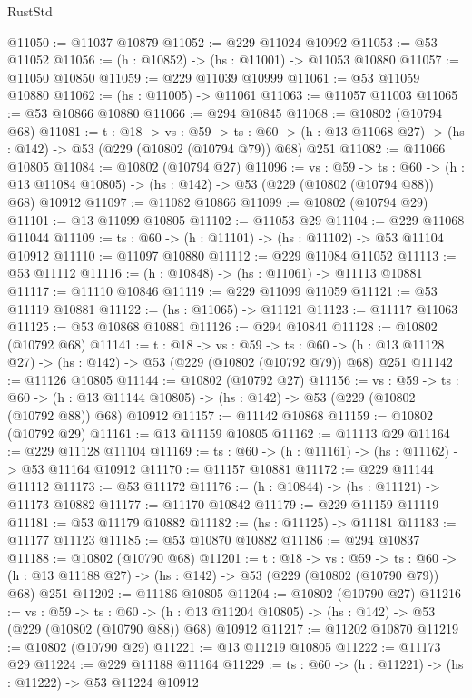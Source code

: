 \begin{lexlean}{RustStd}
\begin{coremodule}
@11050 := @11037 @10879
@11052 := @229 @11024 @10992
@11053 := @53 @11052
@11056 := (h : @10852) -> (hs : @11001) -> @11053 @10880
@11057 := @11050 @10850
@11059 := @229 @11039 @10999
@11061 := @53 @11059 @10880
@11062 := (hs : @11005) -> @11061
@11063 := @11057 @11003
@11065 := @53 @10866 @10880
@11066 := @294 @10845
@11068 := @10802 (@10794 @68)
@11081 := {t : @18} ->
  {vs : @59} ->
  {ts : @60} -> (h : @13 @11068 @27) -> (hs : @142) -> @53 (@229 (@10802 (@10794 @79)) @68) @251
@11082 := @11066 @10805
@11084 := @10802 (@10794 @27)
@11096 := {vs : @59} ->
  {ts : @60} ->
  (h : @13 @11084 @10805) -> (hs : @142) -> @53 (@229 (@10802 (@10794 @88)) @68) @10912
@11097 := @11082 @10866
@11099 := @10802 (@10794 @29)
@11101 := @13 @11099 @10805
@11102 := @11053 @29
@11104 := @229 @11068 @11044
@11109 := {ts : @60} -> (h : @11101) -> (hs : @11102) -> @53 @11104 @10912
@11110 := @11097 @10880
@11112 := @229 @11084 @11052
@11113 := @53 @11112
@11116 := (h : @10848) -> (hs : @11061) -> @11113 @10881
@11117 := @11110 @10846
@11119 := @229 @11099 @11059
@11121 := @53 @11119 @10881
@11122 := (hs : @11065) -> @11121
@11123 := @11117 @11063
@11125 := @53 @10868 @10881
@11126 := @294 @10841
@11128 := @10802 (@10792 @68)
@11141 := {t : @18} ->
  {vs : @59} ->
  {ts : @60} -> (h : @13 @11128 @27) -> (hs : @142) -> @53 (@229 (@10802 (@10792 @79)) @68) @251
@11142 := @11126 @10805
@11144 := @10802 (@10792 @27)
@11156 := {vs : @59} ->
  {ts : @60} ->
  (h : @13 @11144 @10805) -> (hs : @142) -> @53 (@229 (@10802 (@10792 @88)) @68) @10912
@11157 := @11142 @10868
@11159 := @10802 (@10792 @29)
@11161 := @13 @11159 @10805
@11162 := @11113 @29
@11164 := @229 @11128 @11104
@11169 := {ts : @60} -> (h : @11161) -> (hs : @11162) -> @53 @11164 @10912
@11170 := @11157 @10881
@11172 := @229 @11144 @11112
@11173 := @53 @11172
@11176 := (h : @10844) -> (hs : @11121) -> @11173 @10882
@11177 := @11170 @10842
@11179 := @229 @11159 @11119
@11181 := @53 @11179 @10882
@11182 := (hs : @11125) -> @11181
@11183 := @11177 @11123
@11185 := @53 @10870 @10882
@11186 := @294 @10837
@11188 := @10802 (@10790 @68)
@11201 := {t : @18} ->
  {vs : @59} ->
  {ts : @60} -> (h : @13 @11188 @27) -> (hs : @142) -> @53 (@229 (@10802 (@10790 @79)) @68) @251
@11202 := @11186 @10805
@11204 := @10802 (@10790 @27)
@11216 := {vs : @59} ->
  {ts : @60} ->
  (h : @13 @11204 @10805) -> (hs : @142) -> @53 (@229 (@10802 (@10790 @88)) @68) @10912
@11217 := @11202 @10870
@11219 := @10802 (@10790 @29)
@11221 := @13 @11219 @10805
@11222 := @11173 @29
@11224 := @229 @11188 @11164
@11229 := {ts : @60} -> (h : @11221) -> (hs : @11222) -> @53 @11224 @10912

\end{coremodule}
\end{lexlean}
